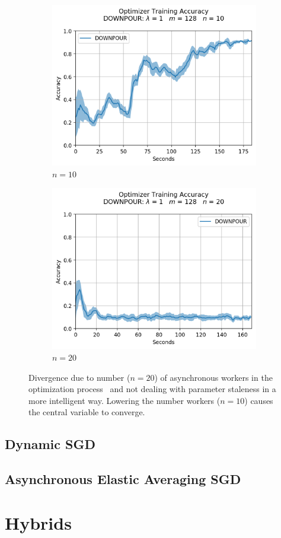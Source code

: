 \begin{figure}[H]
  \centering
  \begin{subfigure}{.49\textwidth}
    \centering
    \includegraphics[width=\linewidth]{resources/images/downpour_10}
    \caption{$n = 10$}
  \end{subfigure}
  \begin{subfigure}{.49\textwidth}
    \centering
    \includegraphics[width=\linewidth]{resources/images/downpour_20}
    \caption{$n = 20$}
  \end{subfigure}
  \caption{Divergence due to number ($n = 20$) of asynchronous workers in the optimization process~\cite{implicitmomentum} and not dealing with parameter staleness in a more intelligent way. Lowering the number workers ($n = 10$) causes the central variable to converge.}
  \label{fig:downpour_convergence}
\end{figure}


\subsection{Dynamic SGD}
\label{sec:dyn_sgd}

\subsection{Asynchronous Elastic Averaging SGD}
\label{sec:aeasgd}

\section{Hybrids}
\label{sec:hybrids}
